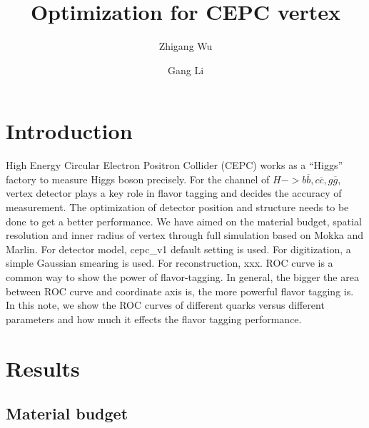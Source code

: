 \documentclass[usetikz]{style/cepcnote}
\title{Optimization for CEPC vertex}
\author[a,b]{Zhigang Wu}
\author[a]{Gang Li}
\affil[a]{Institude of High Energy Physics, CAS}
\affil[b]{University of Chinese Academy of Science}
\begin{document}
\section{Introduction}

High Energy Circular Electron Positron Collider (CEPC) works as a “Higgs” factory to measure Higgs boson precisely. For the channel of $H->b\overline{b}, c\overline{c}, g\overline{g}$, vertex detector plays a key role in flavor tagging and decides the accuracy of measurement. The optimization of detector position and structure needs to be done to get a better performance. We have aimed on the material budget, spatial resolution and inner radius of vertex through full simulation based on Mokka and Marlin. For detector model, cepc\_v1 default setting is used. For digitization, a simple Gaussian smearing is used. For reconstruction, xxx. ROC curve is a common way to show the power of flavor-tagging. In general, the bigger the area between ROC curve and coordinate axis is, the more powerful flavor tagging is. In this note, we show the ROC curves of different quarks versus different parameters and how much it effects the flavor tagging performance. 

\section{Results}

\subsection{Material budget}
\end{document}
